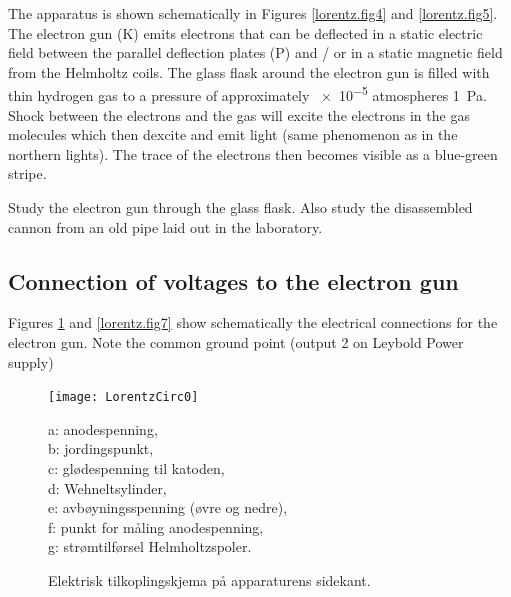 \documentclass[../Elmag-labhefte-2020.tex]{subfiles}
\begin{document}
The apparatus is shown schematically in Figures \ref{lorentz.fig4} and \ref{lorentz.fig5}. The electron gun (\textsf{K}) emits electrons that can be deflected in a static electric field between the parallel deflection plates (\textsf{P}) and / or in a static magnetic field from the Helmholtz coils. The glass flask around the electron gun is filled with thin hydrogen gas to a pressure of approximately \num{e-5} atmospheres \SI{1}{\pascal}. Shock between the electrons and the gas will excite the electrons in the gas molecules which then dexcite and emit light (same phenomenon as in the northern lights). The trace of the electrons then becomes visible as a blue-green stripe.

{\itsf Study the electron gun through the glass flask. Also study the disassembled cannon from an old pipe laid out in the laboratory.}
\newpage
\subsection{Connection of voltages to the electron gun}

Figures \ref{lorentz.fig6} and \ref{lorentz.fig7} show schematically the electrical connections for the electron gun. Note the common ground point (output 2 on Leybold Power supply)

\begin{figure}[!ht]
    \vspace{-9em}
    \texttt{[image: LorentzCirc0]}
    \begin{minipage}[b]{0.42\textwidth}
        \textsf{%
            a: anodespenning,\\
            b: jordingspunkt,\\
            c: glødespenning til katoden,\\
            d: Wehneltsylinder,\\
            e: avbøyningsspenning (øvre og nedre),\\
            f: punkt for måling anodespenning,\\
            g: strømtilførsel Helmholtzspoler.
            \vspace{15mm}
        }
    \end{minipage}
    \caption{%
        Elektrisk tilkoplingskjema på apparaturens sidekant.
    }
    \label{lorentz.fig6}
\end{figure}
\end{document}
